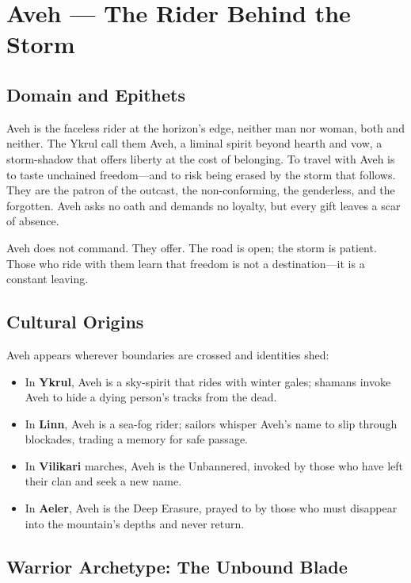 \section{Aveh — The Rider Behind the Storm}

\subsection{Domain and Epithets}

Aveh is the faceless rider at the horizon's edge, neither man nor woman, both and neither. The Ykrul call them Aveh, a liminal spirit beyond hearth and vow, a storm-shadow that offers liberty at the cost of belonging. To travel with Aveh is to taste unchained freedom—and to risk being erased by the storm that follows. They are the patron of the outcast, the non-conforming, the genderless, and the forgotten. Aveh asks no oath and demands no loyalty, but every gift leaves a scar of absence.

Aveh does not command. They offer. The road is open; the storm is patient. Those who ride with them learn that freedom is not a destination—it is a constant leaving.

\subsection{Cultural Origins}

Aveh appears wherever boundaries are crossed and identities shed:

\begin{itemize}
\item In \textbf{Ykrul}, Aveh is a sky-spirit that rides with winter gales; shamans invoke Aveh to hide a dying person's tracks from the dead.
\item In \textbf{Linn}, Aveh is a sea-fog rider; sailors whisper Aveh's name to slip through blockades, trading a memory for safe passage.
\item In \textbf{Vilikari} marches, Aveh is the Unbannered, invoked by those who have left their clan and seek a new name.
\item In \textbf{Aeler}, Aveh is the Deep Erasure, prayed to by those who must disappear into the mountain's depths and never return.
\end{itemize}

\subsection{Warrior Archetype: The Unbound Blade}

